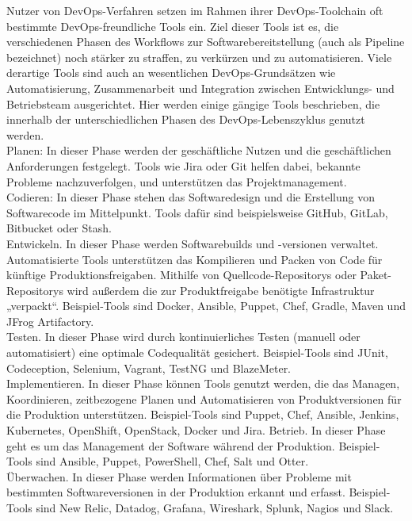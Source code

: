 Nutzer von DevOps-Verfahren setzen im Rahmen ihrer DevOps-Toolchain oft bestimmte DevOps-freundliche Tools ein. Ziel dieser Tools ist es, die verschiedenen Phasen des Workflows zur Softwarebereitstellung (auch als Pipeline bezeichnet) noch stärker zu straffen, zu verkürzen und zu automatisieren. Viele derartige Tools sind auch an wesentlichen DevOps-Grundsätzen wie Automatisierung, Zusammenarbeit und Integration zwischen Entwicklungs- und Betriebsteam ausgerichtet. Hier werden einige gängige Tools beschrieben, die innerhalb der unterschiedlichen Phasen des DevOps-Lebenszyklus genutzt werden.\\


Planen: In dieser Phase werden der geschäftliche Nutzen und die geschäftlichen Anforderungen festgelegt. Tools wie Jira oder Git helfen dabei, bekannte Probleme nachzuverfolgen, und unterstützen das Projektmanagement.\\


Codieren: In dieser Phase stehen das Softwaredesign und die Erstellung von Softwarecode im Mittelpunkt. Tools dafür sind beispielsweise GitHub, GitLab, Bitbucket oder Stash.\\


Entwickeln. In dieser Phase werden Softwarebuilds und -versionen verwaltet. Automatisierte Tools unterstützen das Kompilieren und Packen von Code für künftige Produktionsfreigaben. Mithilfe von Quellcode-Repositorys oder Paket-Repositorys wird außerdem die zur Produktfreigabe benötigte Infrastruktur „verpackt“. Beispiel-Tools sind Docker, Ansible, Puppet, Chef, Gradle, Maven und JFrog Artifactory.\\


Testen. In dieser Phase wird durch kontinuierliches Testen (manuell oder automatisiert) eine optimale Codequalität gesichert. Beispiel-Tools sind JUnit, Codeception, Selenium, Vagrant, TestNG und BlazeMeter.\\


Implementieren. In dieser Phase können Tools genutzt werden, die das Managen, Koordinieren, zeitbezogene Planen und Automatisieren von Produktversionen für die Produktion unterstützen. Beispiel-Tools sind Puppet, Chef, Ansible, Jenkins, Kubernetes, OpenShift, OpenStack, Docker und Jira.
Betrieb. In dieser Phase geht es um das Management der Software während der Produktion. Beispiel-Tools sind Ansible, Puppet, PowerShell, Chef, Salt und Otter.\\


Überwachen. In dieser Phase werden Informationen über Probleme mit bestimmten Softwareversionen in der Produktion erkannt und erfasst. Beispiel-Tools sind New Relic, Datadog, Grafana, Wireshark, Splunk, Nagios und Slack.